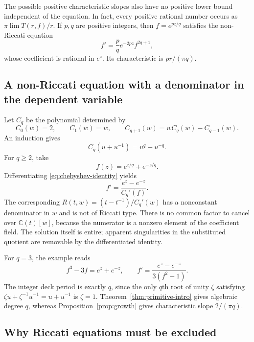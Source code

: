 \documentclass[11pt,reqno]{amsart}
\numberwithin{equation}{section}
\theoremstyle{definition}
\theoremstyle{remark}
\newcommand{\C}{\mathbb C}
\begin{document}
The possible positive characteristic slopes also have no positive
lower bound independent of the equation. In fact, every positive
rational number occurs as $\pi\lim T(r,f)/r$. If $p,q$ are positive
integers, then $f=e^{pz/q}$ satisfies the non-Riccati equation
\begin{equation}
 f'=\frac pq e^{-2pz} f^{2q+1},
 \label{eq:rational-types}
\end{equation}
whose coefficient is rational in $e^z$. Its characteristic is
$pr/(\pi q)$.

\subsection{A non-Riccati equation with a denominator in the dependent variable}

Let $C_q$ be the polynomial determined by
\[
 C_0(w)=2,\qquad C_1(w)=w,\qquad
 C_{q+1}(w)=wC_q(w)-C_{q-1}(w).
\]
An induction gives
\begin{equation}
 C_q(u+u^{-1})=u^q+u^{-q}.
 \label{eq:chebyshev-identity}
\end{equation}
For $q\geq2$, take
\begin{equation}
 f(z)=e^{z/q}+e^{-z/q}.
 \label{eq:two-sided-example}
\end{equation}
Differentiating \eqref{eq:chebyshev-identity} yields
\begin{equation}
 f'=\frac{e^z-e^{-z}}{C_q'(f)}.
 \label{eq:chebyshev-equation}
\end{equation}
The corresponding $R(t,w)=(t-t^{-1})/C_q'(w)$ has a nonconstant
denominator in $w$ and is not of Riccati type. There is no common
factor to cancel over $\C(t)[w]$, because the numerator is a
nonzero element of the coefficient field. The solution itself is
entire; apparent singularities in the substituted quotient are
removable by the differentiated identity.

For $q=3$, the example reads
\[
 f^3-3f=e^z+e^{-z},\qquad
 f'=\frac{e^z-e^{-z}}{3(f^2-1)}.
\]
The integer deck period is exactly $q$, since the only
$q$th root of unity $\zeta$ satisfying
$\zeta u+\zeta^{-1}u^{-1}=u+u^{-1}$ is $\zeta=1$.
Theorem~\ref{thm:primitive-intro} gives algebraic degree $q$,
whereas Proposition~\ref{prop:growth} gives characteristic slope
$2/(\pi q)$.

\subsection{Why Riccati equations must be excluded}
\end{document}
